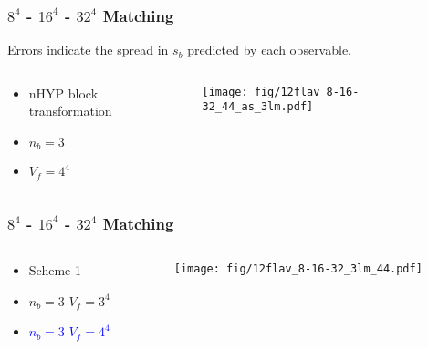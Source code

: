 \documentclass{beamer}
\begin{document}
  \begin{frame}
    \frametitle{$8^4$ - $16^4$ - $32^4$ Matching}
    \begin{center}
      Errors indicate the spread in $s_b$ predicted by each observable.
    \end{center}
    \begin{columns}[T]
      \begin{column}{.3\textwidth}
        \begin{block}{}
          \begin{itemize}
            \item nHYP block transformation
            \item $n_b=3$
            \item $V_f=4^4$
          \end{itemize}
        \end{block}
      \end{column}
      \begin{column}{.7\textwidth}
        \begin{block}{}
          \texttt{[image: fig/12flav\_8-16-32\_44\_as\_3lm.pdf]}
        \end{block}
      \end{column}
    \end{columns}
    \begin{center}
    \end{center}
  \end{frame}

  \begin{frame}
    \frametitle{$8^4$ - $16^4$ - $32^4$ Matching}
    \begin{columns}[T]
      \begin{column}{.3\textwidth}
        \begin{block}{}
          \begin{itemize}
            \item Scheme 1
            \item $n_b=3$ $V_f=3^4$
            \item \textcolor{blue}{$n_b=3$ $V_f=4^4$}
          \end{itemize}
        \end{block}
      \end{column}
      \begin{column}{.7\textwidth}
        \begin{block}{}
          \texttt{[image: fig/12flav\_8-16-32\_3lm\_44.pdf]}
        \end{block}
      \end{column}
    \end{columns}
  \end{frame}
\end{document}
